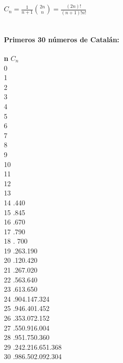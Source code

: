 
{\LARGE $C_{n} = \frac{1}{n+1}\binom{2n}{n} = \frac{(2n)!}{(n+1)!n!}$}\\ \\
\paragraph{Primeros 30 n\'umeros de Catal\'an:\\}
\begin{tabbing}
\textbf{n}\hspace{3cm} \=  \textbf{$C_{n}$}\hspace{4cm}  \\ 
0  \\ 
1  \\ 
2  \\ 
3  \\ 
4  \\ 
5  \\ 
6  \\ 
7  \\ 
8 \\ 
9 \\ 
10 \\ 
11 \\
12 \\
13 \\ 
14 .440\\ 
15 .845\\ 
16 .670\\
17 .790\\
18 . 700\\
19 .263.190\\
20 .120.420\\ 
21 .267.020\\
22 .563.640\\ 
23 .613.650\\ 
24 .904.147.324\\
25 .946.401.452\\ 
26 .353.072.152\\ 
27 .550.916.004\\ 
28 .951.750.360\\ 
29 .242.216.651.368\\
30 .986.502.092.304\\ 
\end{tabbing}

